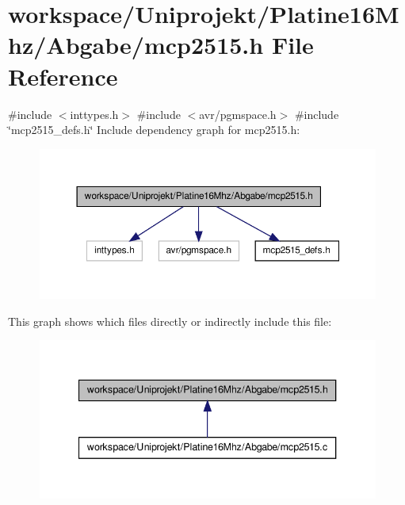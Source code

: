 \section{workspace/\-Uniprojekt/\-Platine16\-Mhz/\-Abgabe/mcp2515.h \-File \-Reference}
\label{mcp2515_8h}
{\ttfamily \#include $<$inttypes.\-h$>$}\*
{\ttfamily \#include $<$avr/pgmspace.\-h$>$}\*
{\ttfamily \#include \char`\"{}mcp2515\-\_\-defs.\-h\char`\"{}}\*
\-Include dependency graph for mcp2515.\-h\-:\nopagebreak
\begin{figure}[H]
\begin{center}
\leavevmode
\includegraphics[width=350pt]{mcp2515_8h__incl}
\end{center}
\end{figure}
\-This graph shows which files directly or indirectly include this file\-:\nopagebreak
\begin{figure}[H]
\begin{center}
\leavevmode
\includegraphics[width=340pt]{mcp2515_8h__dep__incl}
\end{center}
\end{figure}

